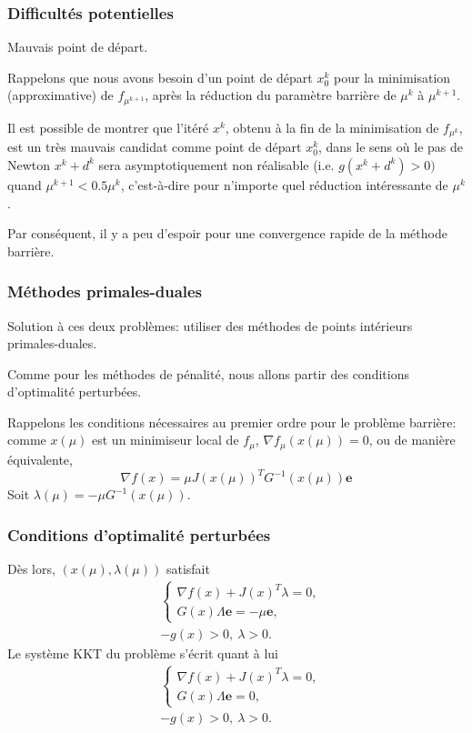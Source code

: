 \documentclass[usepdftitle=false,aspectratio=169]{beamer}
\def\be{\boldsymbol{e}}
\begin{document}
\begin{frame}
\frametitle{Difficultés potentielles}

Mauvais point de départ.

\mbox{}

Rappelons que nous avons besoin d'un point de départ $x_0^k$ pour la minimisation (approximative) de $f_{\mu^{k+1}}$, après la réduction du paramètre barrière de $\mu^k$ à $\mu^{k+1}$.

\mbox{}

Il est possible de montrer que l'itéré $x^k$, obtenu à la fin de la minimisation de $f_{\mu^k}$, est un très mauvais candidat comme point de départ $x_0^k$, dans le sens où le pas de Newton $x^k + d^k$ sera asymptotiquement non réalisable (i.e. $g(x^k + d^k) > 0)$ quand $\mu^{k+1} < 0.5 \mu^k$, c'est-à-dire pour n'importe quel réduction intéressante de $\mu^k$.

\mbox{}

Par conséquent, il y a peu d'espoir pour une convergence rapide de la méthode barrière.

\end{frame}

\begin{frame}
\frametitle{Méthodes primales-duales}

Solution à ces deux problèmes: utiliser des méthodes de points intérieurs primales-duales.

\mbox{}

Comme pour les méthodes de pénalité, nous allons partir des conditions d'optimalité perturbées.

\mbox{}

Rappelons les conditions nécessaires au premier ordre pour le problème barrière:
comme $x(\mu)$ est un minimiseur local de $f_\mu$, $\nabla f_{\mu}(x(\mu)) = 0$, ou
de manière équivalente,
$$
\nabla f(x) = \mu J(x(\mu))^T G^{-1}(x(\mu)) \be
$$
Soit $\lambda(\mu) = -\mu G^{-1}(x(\mu))$.

\end{frame}

\begin{frame}
\frametitle{Conditions d'optimalité perturbées}

Dès lors, $(x(\mu), \lambda(\mu))$ satisfait
\begin{align*}
& \begin{cases}
\nabla f(x) + J(x)^T\lambda = 0, \\
G(x)\Lambda\be = -\mu\be,
\end{cases} \\
& -g(x) > 0,\ \lambda > 0.
\end{align*}
Le système KKT du problème s'écrit quant à lui
\begin{align*}
& \begin{cases}
\nabla f(x) + J(x)^T\lambda = 0, \\
G(x)\Lambda\be = 0,
\end{cases} \\
& -g(x) > 0,\ \lambda > 0.
\end{align*}

\end{frame}
\end{document}
